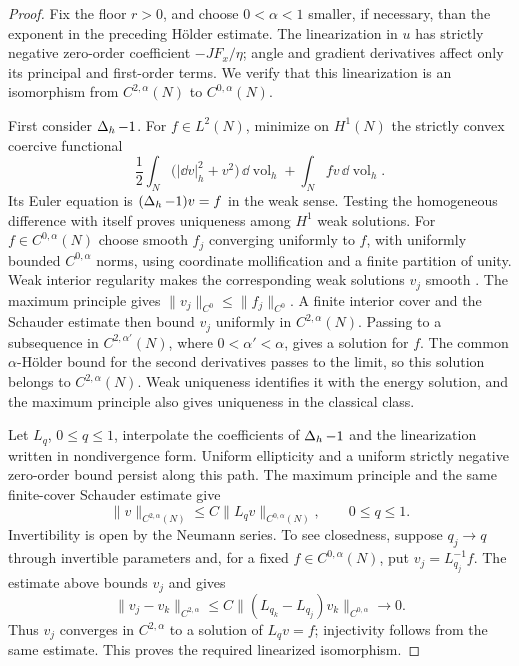 \begin{proof}
Fix the floor $r>0$, and choose $0<\alpha<1$ smaller, if necessary,
than the exponent in the preceding H\"older estimate.
The linearization in $u$ has strictly negative zero-order coefficient
$-JF_x/\eta$; angle and gradient derivatives affect only its principal
and first-order terms.  We verify that this linearization is an
isomorphism from $C^{2,\alpha}(N)$ to $C^{0,\alpha}(N)$.

First consider $\operatorname{\Delta}_h-1$.  For $f\in L^2(N)$, minimize on $H^1(N)$
the strictly convex coercive functional
\[
 \frac12\int_N\bigl(|\dd v|_h^2+v^2\bigr)
                 \,\dd\operatorname{vol}_h
 +\int_N fv\,\dd\operatorname{vol}_h.
\]
Its Euler equation is $(\operatorname{\Delta}_h-1)v=f$ in the weak sense.
Testing the homogeneous difference with itself proves uniqueness
among $H^1$ weak solutions.
For $f\in C^{0,\alpha}(N)$ choose smooth $f_j$ converging uniformly
to $f$, with uniformly bounded $C^{0,\alpha}$ norms, using coordinate
mollification and a finite partition of unity.  Weak interior
regularity makes the corresponding weak solutions $v_j$ smooth
\citep[Lecture~6, Theorem~1 and Corollary~1]{simonPDE}.
The maximum principle gives $\|v_j\|_{C^0}\le\|f_j\|_{C^0}$.
A finite interior cover and the Schauder estimate
\citep[Lecture~12, Theorem~2]{simonPDE} then bound $v_j$ uniformly
in $C^{2,\alpha}(N)$.  Passing to a subsequence in
$C^{2,\alpha'}(N)$, where $0<\alpha'<\alpha$, gives a solution for $f$.
The common $\alpha$-H\"older bound for the second derivatives passes
to the limit, so this solution belongs to $C^{2,\alpha}(N)$.
Weak uniqueness identifies it with the energy solution, and the
maximum principle also gives uniqueness in the classical class.

Let $L_q$, $0\le q\le1$, interpolate the coefficients of
$\operatorname{\Delta}_h-1$ and the linearization written in nondivergence form.
Uniform ellipticity and a uniform
strictly negative zero-order bound persist along this path.  The
maximum principle and the same finite-cover Schauder estimate give
\[
 \|v\|_{C^{2,\alpha}(N)}
 \le C\|L_qv\|_{C^{0,\alpha}(N)},
 \qquad 0\le q\le1.
\]
Invertibility is open by the Neumann series.  To see closedness,
suppose $q_j\to q$ through invertible parameters and, for a fixed
$f\in C^{0,\alpha}(N)$, put $v_j=L_{q_j}^{-1}f$.
The estimate above bounds $v_j$ and gives
\[
 \|v_j-v_k\|_{C^{2,\alpha}}
 \le C\|(L_{q_k}-L_{q_j})v_k\|_{C^{0,\alpha}}
 \longrightarrow0.
\]
Thus $v_j$ converges in $C^{2,\alpha}$ to a solution of
$L_qv=f$; injectivity follows from the same estimate.
This proves the required linearized isomorphism.


\end{proof}
